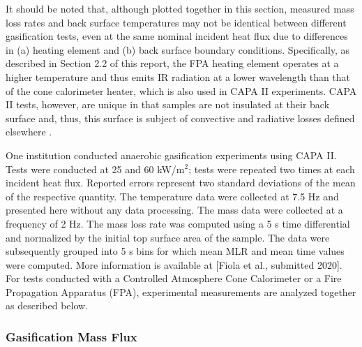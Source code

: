 \documentclass{book}
\begin{document}
It should be noted that, although plotted together in this section, measured mass loss rates and back surface temperatures may not be identical between different gasification tests, even at the same nominal incident heat flux due to differences in (a) heating element and (b) back surface boundary conditions. Specifically, as described in Section 2.2 of this report, the FPA heating element operates at a higher temperature and thus emits IR radiation at a lower wavelength than that of the cone calorimeter heater, which is also used in CAPA II experiments. CAPA II tests, however, are unique in that samples are not insulated at their back surface and, thus, this surface is subject of convective and radiative losses defined elsewhere \cite{swann2017controlled}.

One institution conducted anaerobic gasification experiments using CAPA II. Tests were conducted at 25 and 60 kW/m$^2$; tests were repeated two times at each incident heat flux. Reported errors represent two standard deviations of the mean of the respective quantity. The temperature data were collected at 7.5 Hz and presented here without any data processing. The mass data were collected at a frequency of 2 Hz. The mass loss rate was computed using a 5 s time differential and normalized by the initial top surface area of the sample. The data were subsequently grouped into 5 s bins for which mean MLR and mean time values were computed. More information is available at [Fiola et al., submitted 2020]. For tests conducted with a Controlled Atmosphere Cone Calorimeter or a Fire Propagation Apparatus (FPA), experimental measurements are analyzed together as described below.

\subsubsection{Gasification Mass Flux}
\end{document}

